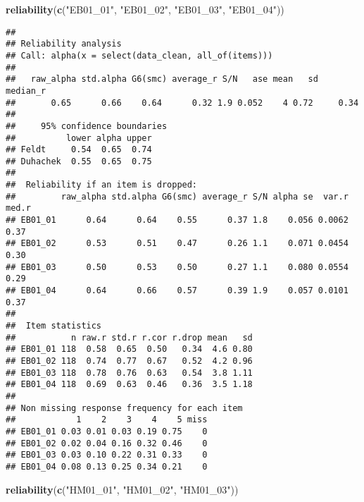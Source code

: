 \documentclass[
]{article}
\newenvironment{Shaded}{\begin{snugshade}}{\end{snugshade}}
\newcommand{\FunctionTok}[1]{\textcolor[rgb]{0.13,0.29,0.53}{\textbf{#1}}}
\newcommand{\NormalTok}[1]{#1}
\newcommand{\StringTok}[1]{\textcolor[rgb]{0.31,0.60,0.02}{#1}}
\begin{document}
\begin{Shaded}
\begin{Highlighting}[]
\FunctionTok{reliability}\NormalTok{(}\FunctionTok{c}\NormalTok{(}\StringTok{"EB01\_01"}\NormalTok{, }\StringTok{"EB01\_02"}\NormalTok{, }\StringTok{"EB01\_03"}\NormalTok{, }\StringTok{"EB01\_04"}\NormalTok{))}
\end{Highlighting}
\end{Shaded}

\begin{verbatim}
## 
## Reliability analysis   
## Call: alpha(x = select(data_clean, all_of(items)))
## 
##   raw_alpha std.alpha G6(smc) average_r S/N   ase mean   sd median_r
##       0.65      0.66    0.64      0.32 1.9 0.052    4 0.72     0.34
## 
##     95% confidence boundaries 
##          lower alpha upper
## Feldt     0.54  0.65  0.74
## Duhachek  0.55  0.65  0.75
## 
##  Reliability if an item is dropped:
##         raw_alpha std.alpha G6(smc) average_r S/N alpha se  var.r med.r
## EB01_01      0.64      0.64    0.55      0.37 1.8    0.056 0.0062  0.37
## EB01_02      0.53      0.51    0.47      0.26 1.1    0.071 0.0454  0.30
## EB01_03      0.50      0.53    0.50      0.27 1.1    0.080 0.0554  0.29
## EB01_04      0.64      0.66    0.57      0.39 1.9    0.057 0.0101  0.37
## 
##  Item statistics 
##           n raw.r std.r r.cor r.drop mean   sd
## EB01_01 118  0.58  0.65  0.50   0.34  4.6 0.80
## EB01_02 118  0.74  0.77  0.67   0.52  4.2 0.96
## EB01_03 118  0.78  0.76  0.63   0.54  3.8 1.11
## EB01_04 118  0.69  0.63  0.46   0.36  3.5 1.18
## 
## Non missing response frequency for each item
##            1    2    3    4    5 miss
## EB01_01 0.03 0.01 0.03 0.19 0.75    0
## EB01_02 0.02 0.04 0.16 0.32 0.46    0
## EB01_03 0.03 0.10 0.22 0.31 0.33    0
## EB01_04 0.08 0.13 0.25 0.34 0.21    0
\end{verbatim}

\begin{Shaded}
\begin{Highlighting}[]
\FunctionTok{reliability}\NormalTok{(}\FunctionTok{c}\NormalTok{(}\StringTok{"HM01\_01"}\NormalTok{, }\StringTok{"HM01\_02"}\NormalTok{, }\StringTok{"HM01\_03"}\NormalTok{))}
\end{Highlighting}
\end{Shaded}
\end{document}
